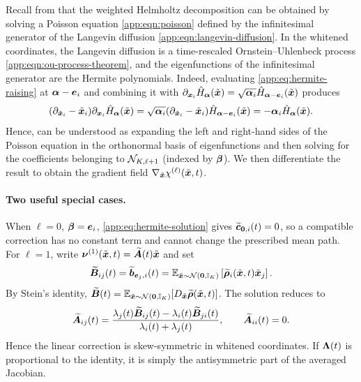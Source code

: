 Recall from  that the weighted Helmholtz decomposition can be obtained by solving a Poisson equation \cref{app:eqn:poisson} defined by the infinitesimal generator of the Langevin diffusion \cref{app:eqn:langevin-diffusion}.
In the whitened coordinates, the Langevin diffusion is a time-rescaled Ornstein--Uhlenbeck process \cref{app:eqn:ou-process-theorem}, and the eigenfunctions of the  infinitesimal generator are the Hermite polynomials.
Indeed, evaluating \cref{app:eq:hermite-raising} at $\boldsymbol{\alpha} - \boldsymbol{e}_i$ and combining it with $\partial_{\boldsymbol{x}_i} \hat{H}_{\boldsymbol{\alpha}}(\tilde{\boldsymbol{x}}) = \sqrt{\boldsymbol{\alpha}_i} \hat{H}_{\boldsymbol{\alpha} - \boldsymbol{e}_i}(\tilde{\boldsymbol{x}})$ produces
\begin{equation*}
    (\partial_{\tilde{\boldsymbol{x}}_i}-\tilde{\boldsymbol{x}}_i)\partial_{\boldsymbol{x}_i} \hat{H}_{\boldsymbol{\alpha}}(\tilde{\boldsymbol{x}}) = \sqrt{\boldsymbol{\alpha}_i} (\partial_{\tilde{\boldsymbol{x}}_i}-\tilde{\boldsymbol{x}}_i) \hat{H}_{\boldsymbol{\alpha} - \boldsymbol{e}_i}(\tilde{\boldsymbol{x}}) = - \boldsymbol{\alpha}_i \hat{H}_{\boldsymbol{\alpha}}(\tilde{\boldsymbol{x}}).
\end{equation*}
Hence,  can be understood as expanding the left and right-hand sides of the Poisson equation in the orthonormal basis of eigenfunctions and then solving for the coefficients belonging to $\mathcal{N}_{K, \ell+1}$ (indexed by $\boldsymbol{\beta}$).
We then differentiate the result to obtain the gradient field $\nabla_{\tilde{\boldsymbol{x}}} \chi^{(\ell)}(\tilde{\boldsymbol{x}},t)$.

\paragraph{Two useful special cases.}
When $\ell = 0$, $\boldsymbol{\beta}=\boldsymbol{e}_i$, \cref{app:eq:hermite-solution} gives $\widetilde{\boldsymbol{c}}_{\boldsymbol{0},i}(t)=0$, so a compatible correction has no constant term and cannot change the prescribed mean path.
For $\ell=1$, write $\boldsymbol{\nu}^{(1)}(\tilde{\boldsymbol{x}}, t)=\widetilde{\boldsymbol{A}}(t)\tilde{\boldsymbol{x}}$ and set
\begin{equation*}
\widetilde{\boldsymbol{B}}_{ij}(t) =\widetilde{\boldsymbol{b}}_{\boldsymbol{e}_j,i}(t) =\mathbb{E}_{\tilde{\boldsymbol{x}}\sim\mathcal{N}(\boldsymbol{0},\mathbb{I}_K)}\left[\widetilde{\boldsymbol{\rho}}_i(\tilde{\boldsymbol{x}},t)\tilde{\boldsymbol{x}}_j\right].
\end{equation*}
By Stein's identity, $\widetilde{\boldsymbol{B}}(t)=\mathbb{E}_{\tilde{\boldsymbol{x}}\sim\mathcal{N}(\boldsymbol{0},\mathbb{I}_K)}[D_{\tilde{\boldsymbol{x}}}\widetilde{\boldsymbol{\rho}}(\tilde{\boldsymbol{x}},t)]$.
The solution reduces to
\begin{equation}\label{app:eq:hermite-degree1}
\widetilde{\boldsymbol{A}}_{ij}(t) = \frac{\lambda_j(t)\widetilde{\boldsymbol{B}}_{ij}(t) -\lambda_i(t)\widetilde{\boldsymbol{B}}_{ji}(t)}{\lambda_i(t)+\lambda_j(t)}, \qquad \widetilde{\boldsymbol{A}}_{ii}(t)=0.
\end{equation}
Hence the linear correction is skew-symmetric in whitened coordinates.
If $\boldsymbol{\Lambda}(t)$ is proportional to the identity, it is simply the antisymmetric part of the averaged Jacobian.

